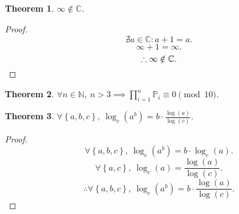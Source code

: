 \documentclass{article}
\begin{document}
\newtheorem{thm}{Theorem}
\begin{thm}
	$\infty \notin \mathbb{C}$.
\end{thm}
\begin{proof}
	\[
		\nexists a \in \mathbb{C} : a + 1 = a.
	\]
	\[
		\infty + 1 = \infty.
	\]
	\[
		\therefore \infty \notin \mathbb{C}.\qedhere
	\]
\end{proof}
\begin{thm}
	$\forall n \in \mathbb{N}, \ n > 3 \implies \prod_{i=1}^n \mathbb{P}_i \equiv 0 \pmod {10}$.
\end{thm}
\begin{thm}
	$\forall \left\{a,b,c\right\}, \ 
	\log_c\left(a^b\right) = b \cdot \frac{\log(a)}{\log(c)}$.
\end{thm}
\begin{proof}
	\[
		\forall \left\{a,b,c\right\}, \
		\log_c\left(a^b\right) =
		b \cdot \log_c\left(a\right).
	\]
	\[
		\forall \left\{a,c\right\}, \ 
		\log_c\left(a\right) =
		\frac{\log\left(a\right)}{\log\left(c\right)}.
	\]
	\[
		\therefore \forall \left\{a,b,c\right\}, \ 
		\log_c\left(a^b\right) =
		b \cdot \frac{\log(a)}{\log(c)}.
	\]
\end{proof}
\end{document}
